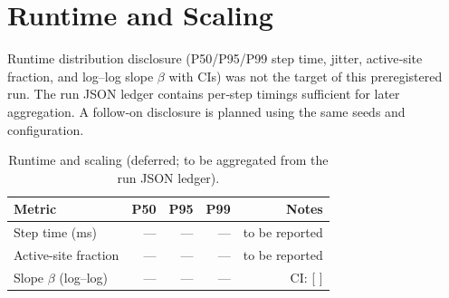 \documentclass{article}
\begin{document}
\section{Runtime and Scaling}
Runtime distribution disclosure (P50/P95/P99 step time, jitter, active‑site fraction, and log–log slope $\beta$ with CIs) was not the target of this preregistered run. The run JSON ledger contains per‑step timings sufficient for later aggregation. A follow‑on disclosure is planned using the same seeds and configuration.

\begin{table}[t]
  \centering
  \caption{Runtime and scaling (deferred; to be aggregated from the run JSON ledger).}
  \label{tab:runtime}
  \begin{tabular}{@{}lrrrr@{}}
  \toprule
  Metric & P50 & P95 & P99 & Notes \\
  \midrule
  Step time (\si{ms}) & — & — & — & to be reported \\
  Active-site fraction & — & — & — & to be reported \\
  Slope $\beta$ (log–log) & — & — & — & CI: [\,\,] \\
  \bottomrule
  \end{tabular}
\end{table}

\FloatBarrier
\clearpage

\end{document}

